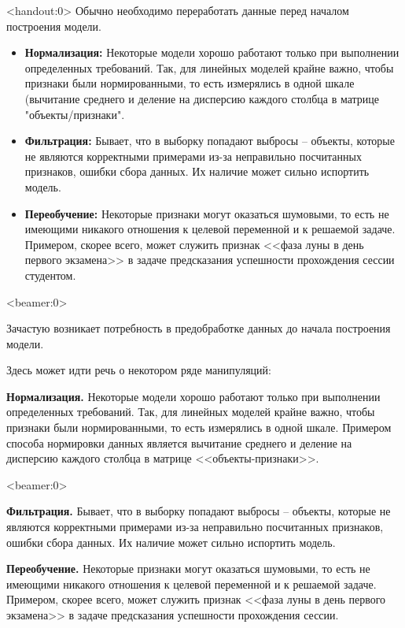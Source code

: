 \documentclass[pdf, intlimits, 9pt, unicode]{beamer}
\begin{document}
\begin{frame}<handout:0>
Обычно необходимо переработать данные перед началом построения модели.\pause

\begin{itemize}
\item \textbf{Нормализация:} Некоторые модели хорошо работают только при выполнении определенных требований. Так, для линейных моделей крайне важно, чтобы признаки были нормированными, то есть измерялись в одной шкале (вычитание среднего и деление на дисперсию каждого столбца в матрице "объекты/признаки".\pause
\item \textbf{Фильтрация:} Бывает, что в выборку попадают выбросы -- объекты, которые не являются корректными примерами из-за неправильно посчитанных признаков, ошибки сбора данных. Их наличие может сильно испортить модель.\pause
\item \textbf{Переобучение:} {Некоторые признаки могут оказаться шумовыми, то есть не имеющими никакого отношения к целевой переменной и к решаемой задаче. Примером, скорее всего, может служить признак <<фаза луны в день первого экзамена>> в задаче предсказания успешности прохождения сессии студентом.}
\end{itemize}

\end{frame}





\begin{frame}<beamer:0>

Зачастую возникает потребность в предобработке данных до начала построения модели.\pause

Здесь может идти речь о некотором ряде манипуляций:

\textbf{Нормализация.} {Некоторые модели хорошо работают только при выполнении определенных требований. Так, для линейных моделей крайне важно, чтобы признаки были нормированными, то есть измерялись в одной шкале. Примером способа нормировки данных является вычитание среднего и деление на дисперсию каждого столбца в матрице <<объекты-признаки>>.}
\end{frame}





\begin{frame}<beamer:0>

\textbf{Фильтрация.} {Бывает, что в выборку попадают выбросы -- объекты, которые не являются корректными примерами из-за неправильно посчитанных признаков, ошибки сбора данных. Их наличие может сильно испортить модель.}

\textbf{Переобучение.} {Некоторые признаки могут оказаться шумовыми, то есть не имеющими никакого отношения к целевой переменной и к решаемой задаче. Примером, скорее всего, может служить признак <<фаза луны в день первого экзамена>> в задаче предсказания успешности прохождения сессии.}
\end{frame}
\end{document}
